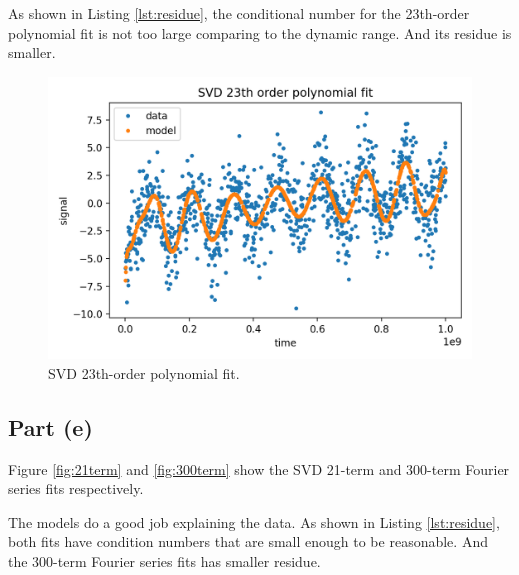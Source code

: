 \documentclass[11pt]{article}
\begin{document}
As shown in Listing \ref{lst:residue}, the conditional number for the 23th-order polynomial fit is not too large comparing to the dynamic range. And its residue is smaller.
\begin{figure}[H]
    \centering
    \includegraphics[scale = 0.7]{images/ps-5-3d.png}
    \caption{SVD 23th-order polynomial fit.}
    \label{fig:23order}
\end{figure}

\subsection{Part (e)}
Figure \ref{fig:21term} and \ref{fig:300term} show the SVD 21-term and 300-term Fourier series fits respectively. 

The models do a good job explaining the data. As shown in Listing \ref{lst:residue}, both fits have condition numbers that are small enough to be reasonable. And the 300-term Fourier series fits has smaller residue.
\end{document}
